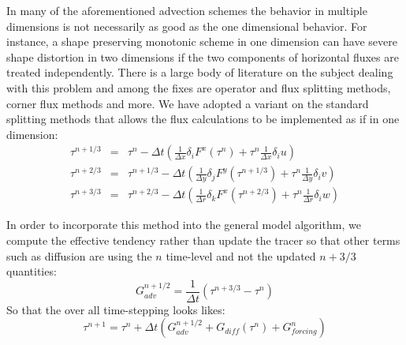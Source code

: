 In many of the aforementioned advection schemes the behavior in
multiple dimensions is not necessarily as good as the one dimensional
behavior. For instance, a shape preserving monotonic scheme in one
dimension can have severe shape distortion in two dimensions if the
two components of horizontal fluxes are treated independently. There
is a large body of literature on the subject dealing with this problem
and among the fixes are operator and flux splitting methods, corner
flux methods and more. We have adopted a variant on the standard
splitting methods that allows the flux calculations to be implemented
as if in one dimension:
\begin{eqnarray}
\tau^{n+1/3} & = & \tau^{n}
- \Delta t \left( \frac{1}{\Delta x} \delta_i F^x(\tau^{n})
           + \tau^{n} \frac{1}{\Delta x} \delta_i u \right) \\
\tau^{n+2/3} & = & \tau^{n+1/3}
- \Delta t \left( \frac{1}{\Delta y} \delta_j F^y(\tau^{n+1/3})
           + \tau^{n} \frac{1}{\Delta y} \delta_i v \right) \\
\tau^{n+3/3} & = & \tau^{n+2/3}
- \Delta t \left( \frac{1}{\Delta r} \delta_k F^x(\tau^{n+2/3})
           + \tau^{n} \frac{1}{\Delta r} \delta_i w \right)
\end{eqnarray}

In order to incorporate this method into the general model algorithm,
we compute the effective tendency rather than update the tracer so
that other terms such as diffusion are using the $n$ time-level and
not the updated $n+3/3$ quantities:
\begin{equation}
G^{n+1/2}_{adv} = \frac{1}{\Delta t} ( \tau^{n+3/3} - \tau^{n} )
\end{equation}
So that the over all time-stepping looks likes:
\begin{equation}
\tau^{n+1} = \tau^{n} + \Delta t \left( G^{n+1/2}_{adv} + G_{diff}(\tau^{n}) + G^{n}_{forcing} \right)
\end{equation}


